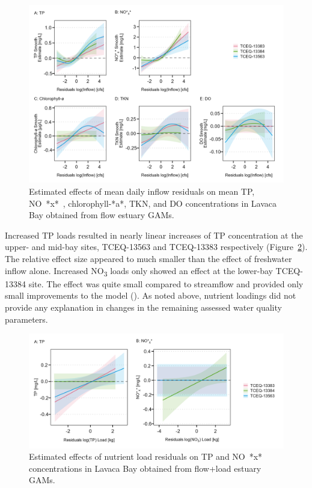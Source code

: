\documentclass[sn-basic,referee,lineno,pdflatex]{sn-jnl}
\begin{document}
\begin{figure}

{\centering \includegraphics[width=1\linewidth,]{Schramm-2023-05-AS_files/figure-latex/fig6-1} 

}

\caption{Estimated effects of mean daily inflow residuals on mean TP, NO~*x*~, chlorophyll-*a*, TKN, and DO concentrations in Lavaca Bay obtained from flow estuary GAMs.}\label{fig:fig6}
\end{figure}

Increased TP loads resulted in nearly linear increases of TP
concentration at the upper- and mid-bay sites, TCEQ-13563 and TCEQ-13383
respectively (Figure~\ref{fig:fig7}). The relative effect size appeared
to much smaller than the effect of freshwater inflow alone. Increased
NO\textsubscript{3} loads only showed an effect at the lower-bay
TCEQ-13384 site. The effect was quite small compared to streamflow and
provided only small improvements to the model (\citet{tbl-table4}). As
noted above, nutrient loadings did not provide any explanation in
changes in the remaining assessed water quality parameters.

\begin{figure}

{\centering \includegraphics[width=1\linewidth,]{Schramm-2023-05-AS_files/figure-latex/fig7-1} 

}

\caption{Estimated effects of nutrient load residuals on TP and NO~*x*~ concentrations in Lavaca Bay obtained from flow+load estuary GAMs.}\label{fig:fig7}
\end{figure}
\end{document}
